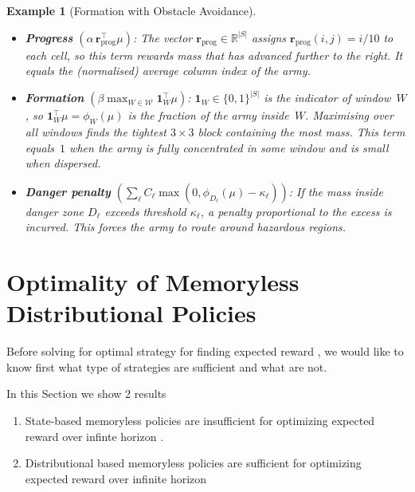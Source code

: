 \documentclass{article}
\newtheorem{example}{Example}
\begin{document}
\begin{example}[Formation with Obstacle Avoidance]
\begin{itemize}
\item \textbf{Progress} $(\alpha\,\mathbf{r}_{\mathrm{prog}}^{\!\top}\mu)$:
  The vector $\mathbf{r}_{\mathrm{prog}}\in\mathbb{R}^{|S|}$ assigns
  $\mathbf{r}_{\mathrm{prog}}(i,j)=i/10$ to each cell, so this term
  rewards mass that has advanced further to the right.
  It equals the (normalised) average column index of the army.

\item \textbf{Formation}
  $(\beta\max_{W\in\mathcal{W}}\mathbf{1}_{W}^{\!\top}\mu)$:
  $\mathbf{1}_W\in\{0,1\}^{|S|}$ is the indicator of window~$W$, so
  $\mathbf{1}_W^{\!\top}\mu = \phi_W(\mu)$ is the fraction of the army
  inside~$W$. Maximising over all windows finds the tightest
  $3\!\times\!3$ block containing the most mass.
  This term equals~$1$ when the army is fully concentrated in some
  window and is small when dispersed.

\item \textbf{Danger penalty}
  $(\sum_\ell C_\ell\max(0,\phi_{D_\ell}(\mu)-\kappa_\ell))$:
  If the mass inside danger zone $D_\ell$ exceeds threshold
  $\kappa_\ell$, a penalty proportional to the excess is incurred.
  This forces the army to route around hazardous regions.
\end{itemize}



\end{example}






\section{Optimality of Memoryless Distributional Policies}\label{sec:analysis} 

Before solving for optimal strategy for finding expected reward , we would like to know first what type of strategies are sufficient and what are not.

In this Section we show 2 results 
\begin{enumerate}
    \item State-based memoryless policies are insufficient for optimizing expected reward over infinte horizon .
    \item Distributional based memoryless policies are sufficient for optimizing expected reward over infinite horizon
\end{enumerate}
\end{document}
